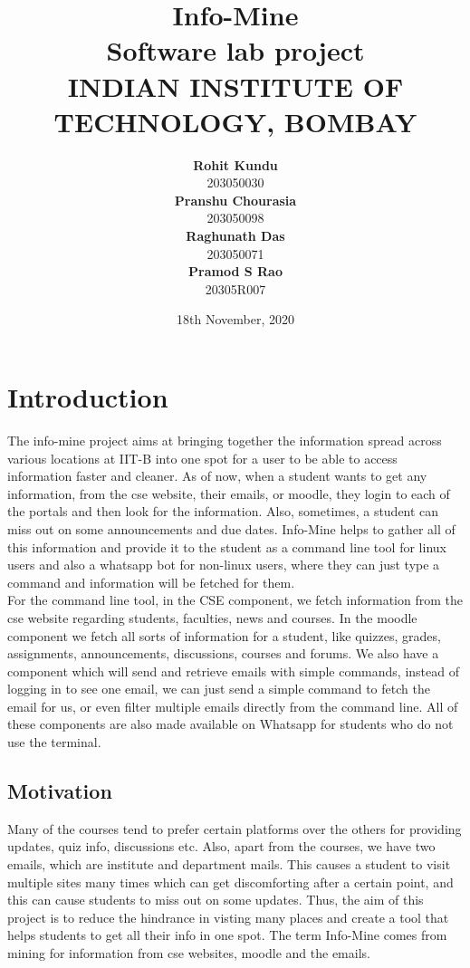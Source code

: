 \documentclass[12pt, letterpaper, twoside]{article}
\title{
    \textbf{Info-Mine}\\
    {Software lab project}\\
    {INDIAN INSTITUTE OF TECHNOLOGY, BOMBAY}
}
\author{ 
    \textbf{Rohit Kundu}\\203050030\\
    \textbf{Pranshu Chourasia}\\203050098\\
    \textbf{Raghunath Das}\\203050071\\
    \textbf{Pramod S Rao}\\20305R007\\
}
\date{18th November, 2020}
\begin{document}
\maketitle

\tableofcontents

\section{Introduction}
    The info-mine project aims at bringing together the information spread across various locations at IIT-B into one spot
    for a user to be able to access information faster and cleaner. As of now, when a student wants to get any information, from the cse website, their emails, or moodle, they login to each of the portals and then look for the information. Also, sometimes, a student can miss out on some announcements and due dates. Info-Mine helps to gather all of this information and provide it to the student as a command line tool for linux users and also a whatsapp bot for non-linux users, where they can just type a command and information will be fetched for them.\\
    For the command line tool, in the CSE component, we fetch information from the cse website regarding students, faculties, news and courses. In the moodle component we fetch all sorts of information for a student, like quizzes, grades, assignments, announcements, discussions, courses and forums. We also have a component which will send and retrieve emails with simple commands, instead of logging in to see one email, we can just send a simple command to fetch the email for us, or even filter multiple emails directly from the command line. All of these components are also made available on Whatsapp for students who do not use the terminal. 

    \subsection{Motivation}
        Many of the courses tend to prefer certain platforms over the others for providing updates, quiz info, discussions etc. 
        Also, apart from the courses, we have two emails, which are institute and department mails.
        This causes a student to visit multiple sites many times which can get discomforting after a certain point, and this can cause students to miss out on some updates. 
        Thus, the aim of this project is to reduce the hindrance in visting many places and create a tool that helps students to get all their info
        in one spot. The term Info-Mine comes from mining for information from cse websites, moodle and the emails.
        
\end{document}
